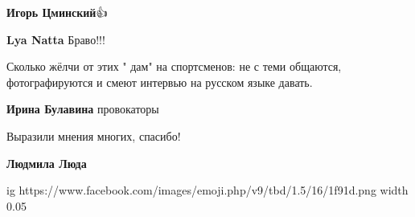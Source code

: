 \begin{itemize}
\begin{itemize}
 
\textbf{Игорь Цминский}👍

 
\textbf{Lya Natta} Браво!!!

\end{itemize}

 
Сколько жёлчи от этих " дам" на спортсменов: не с теми общаются,
фотографируются и смеют интервью на русском языке давать.

\begin{itemize}
 
\textbf{Ирина Булавина} провокаторы
\end{itemize}


Выразили мнения многих, спасибо!

\begin{itemize}
 
\textbf{Людмила Люда} 

\ifcmt
  ig https://www.facebook.com/images/emoji.php/v9/tbd/1.5/16/1f91d.png
  width 0.05
\fi


\end{itemize}
\end{itemize}
